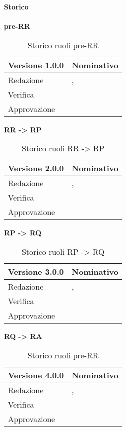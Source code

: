 \newpage
\Large{\textbf{Storico }}\\
\normalsize \\

\textbf{pre-RR}
\label{tabVers1}
\begin{table}[h]
	\begin{tabular}{p{} p{}}
		\toprule \textbf{Versione 1.0.0}	&	\textbf{Nominativo}\\
		\midrule Redazione	& \VG, \TP \\
		\midrule Verifica &	\FM\\
		\midrule Approvazione	& \PM \\
		\bottomrule
	\end{tabular}
	\caption{Storico ruoli pre-RR}
\end{table}

\textbf{RR -> RP}
\label{tabVers2}
\begin{table}[h]
	\begin{tabular}{p{} p{}}
		\toprule \textbf{Versione 2.0.0}	&	\textbf{Nominativo}\\
		\midrule Redazione	& \PM, \BM \\
		\midrule Verifica &	\TP\\
		\midrule Approvazione	& \VG \\
		\bottomrule
	\end{tabular}
	\caption{Storico ruoli RR -> RP}
\end{table}

\textbf{RP -> RQ}
\label{tabVers3}
\begin{table}[h]
	\begin{tabular}{p{} p{}}
		\toprule \textbf{Versione 3.0.0}	&	\textbf{Nominativo}\\
		\midrule Redazione	& \PM, \BM \\
		\midrule Verifica &	\TP\\
		\midrule Approvazione	& \FM \\
		\bottomrule
	\end{tabular}
	\caption{Storico ruoli RP -> RQ}
\end{table}

\textbf{RQ -> RA}
\label{tabVers4}
\begin{table}[h]
	\begin{tabular}{p{} p{}}
		\toprule \textbf{Versione 4.0.0}	&	\textbf{Nominativo}\\
		\midrule Redazione	& \VG, \TP \\
		\midrule Verifica &	\PM \\
		\midrule Approvazione	& \GP \\
		\bottomrule
	\end{tabular}
	\caption{Storico ruoli pre-RR}
\end{table}
